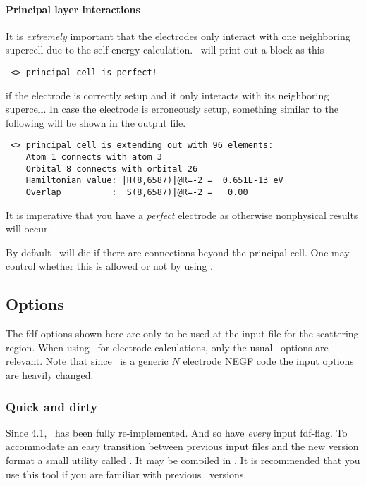 \paragraph{Principal layer interactions} %
%

It is \emph{extremely} important that the electrodes only interact
with one neighboring supercell due to the self-energy
calculation. \tsiesta\ will print out a block as this
\begin{verbatim}
 <> principal cell is perfect!
\end{verbatim}
if the electrode is correctly setup and it only interacts with its
neighboring supercell.
%
In case the electrode is erroneously setup, something similar to the
following will be shown in the output file.
\begin{verbatim}
 <> principal cell is extending out with 96 elements:
    Atom 1 connects with atom 3
    Orbital 8 connects with orbital 26
    Hamiltonian value: |H(8,6587)|@R=-2 =  0.651E-13 eV
    Overlap          :  S(8,6587)|@R=-2 =   0.00    
\end{verbatim}
It is imperative that you have a \emph{perfect} electrode as otherwise
nonphysical results will occur.

By default \tsiesta\ will die if there are connections beyond the
principal cell. One may control whether this is allowed or not by
using .

\subsection{\texorpdfstring{\tsiesta}{TranSIESTA} Options}

The fdf options shown here are only to be used at the input file for
the scattering region. When using \tsiesta\ for electrode
calculations, only the usual \siesta\ options are relevant.
%
Note that since \tsiesta\ is a generic $N$ electrode NEGF code the
input options are heavily changed.

\subsubsection{Quick and dirty}

Since 4.1, \tsiesta\ has been fully re-implemented. And so have
\emph{every} input fdf-flag. To accommodate an easy transition between
previous input files and the new version format a small utility called
. It may be compiled in . It is
recommended that you use this tool if you are familiar with previous
\tsiesta\ versions.

